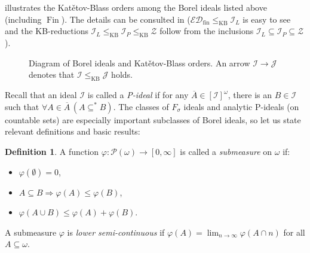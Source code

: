\documentclass[a4paper,12pt]{amsart}
\theoremstyle{definition}
\newtheorem{dfn}[thm]{Definition}
\numberwithin{thm}{section}
\numberwithin{equation}{section}
\newcommand{\ed}{\mathcal{ED}}
\newcommand{\I}{\mathscr{I}}
\newcommand{\J}{\mathscr{J}}
\DeclareMathOperator{\Fin}{Fin}
\newcommand{\edfin}{\mathcal{ED}_\mathrm{fin}}
\newcommand{\finfin}{\mathrm{Fin}\otimes\mathrm{Fin}}
\newcommand{\Z}{\mathcal{Z}}
\newcommand{\nwd}{\mathrm{nwd}}
\newcommand{\conv}{\mathrm{conv}}
\renewcommand{\subset}{\subseteq}
\newcommand{\RandomGraph}{\mathcal{R}}
\newcommand{\Solecki}{\mathcal{S}}
\newcommand{\Polynomial}{\mathscr{I}_P}
\newcommand{\Linear}{\mathscr{I}_L}
\begin{document}
     illustrates the Kat\v{e}tov-Blass orders among the Borel ideals listed above (including $\Fin$). The details can be consulted in \cite{Hru17} ($\edfin\leq_{\mathrm{KB}}\I_L$ is easy to see and the KB-reductions $\I_L\leq_{\mathrm{KB}}\I_P\leq_{\mathrm{KB}}\Z$ follow from the inclusions $\I_L\subseteq\I_P\subseteq\Z$).
	\begin{figure}[h]
		\centering
		\caption{Diagram of Borel ideals and Kat\v{e}tov-Blass orders. An arrow $\I\to\J$ denotes that $\I\leq_{\mathrm{KB}}\J$ holds.}\label{figure:Hrusaks_heart}
	\end{figure}
    
    Recall that an ideal $\I$ is called a \emph{P-ideal} if for any $\overline{A}\in[\I]^\omega$, there is an $B\in\I$ such that $\forall A\in\overline{A}\,(A\subset^* B)$. The classes of $F_\sigma$ ideals and analytic P-ideals (on countable sets) are especially important subclasses of Borel ideals, so let us state relevant definitions and basic results:
    
    \begin{dfn}
        A function $\varphi\colon\mathcal{P}(\omega)\to\left[0,\infty\right]$ is called a \emph{submeasure} on $\omega$ if:
    	\begin{itemize}
    		\item $\varphi(\emptyset)=0$,
    		\item $A\subseteq B\Rightarrow\varphi(A)\leq\varphi(B)$,
    		\item $\varphi(A\cup B)\leq\varphi(A)+\varphi(B)$.
    	\end{itemize}
    	A submeasure $\varphi$ is \emph{lower semi-continuous} if $\varphi(A)=\displaystyle\lim_{n\to\infty}\varphi(A\cap n)$ for all $A\subseteq\omega$.
    \end{dfn}
    
\end{document}
